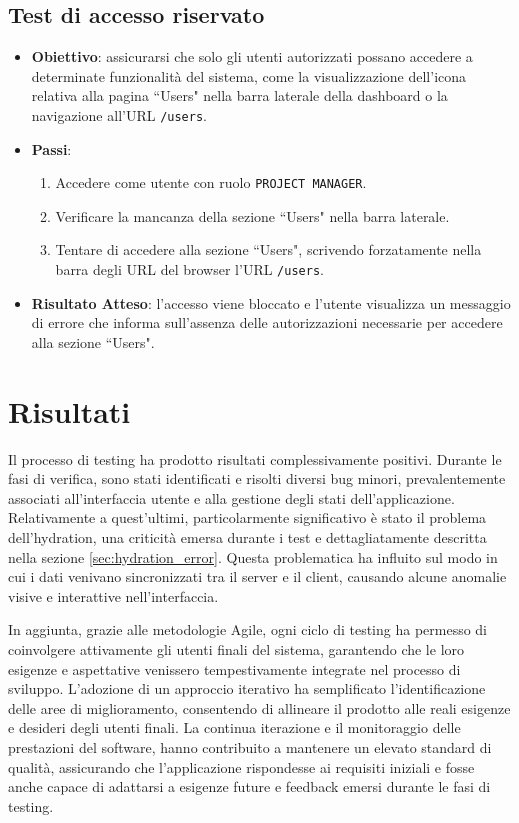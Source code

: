 \documentclass[target=bach,aauheader=,style=]{thud}
\begin{document}
\subsection{Test di accesso riservato}
\begin{itemize}
    \item \textbf{Obiettivo}: assicurarsi che solo gli utenti autorizzati possano accedere a determinate funzionalità del sistema, come la visualizzazione dell'icona relativa alla pagina ``Users" nella barra laterale della dashboard o la navigazione all'URL \texttt{/users}.
    \item \textbf{Passi}:
    \begin{enumerate}
        \item Accedere come utente con ruolo \texttt{PROJECT MANAGER}.
        \item Verificare la mancanza della  sezione ``Users" nella barra laterale.
        \item Tentare di accedere alla sezione ``Users", scrivendo forzatamente nella barra degli URL del browser l'URL \texttt{/users}.
    \end{enumerate}
    \item \textbf{Risultato Atteso}: l'accesso viene bloccato e l'utente visualizza un messaggio di errore che informa sull'assenza delle autorizzazioni necessarie per accedere alla sezione ``Users".
\end{itemize}

\section{Risultati}
Il processo di testing ha prodotto risultati complessivamente positivi. Durante le fasi di verifica, sono stati identificati e risolti diversi bug minori, prevalentemente associati all'interfaccia utente e alla gestione degli stati dell'applicazione. Relativamente a quest'ultimi, particolarmente significativo è stato il problema dell'hydration, una criticità emersa durante i test e dettagliatamente descritta nella sezione \ref{sec:hydration_error}. Questa problematica ha influito sul modo in cui i dati venivano sincronizzati tra il server e il client, causando alcune anomalie visive e interattive nell'interfaccia.

\noindent In aggiunta, grazie alle metodologie Agile, ogni ciclo di testing ha permesso di coinvolgere attivamente gli utenti finali del sistema, garantendo che le loro esigenze e aspettative venissero tempestivamente integrate nel processo di sviluppo. L'adozione di un approccio iterativo ha semplificato l'identificazione delle aree di miglioramento, consentendo di allineare il prodotto alle reali esigenze e desideri degli utenti finali. La continua iterazione e il monitoraggio delle prestazioni del software, hanno contribuito a mantenere un elevato standard di qualità, assicurando che l'applicazione rispondesse ai requisiti iniziali e fosse anche capace di adattarsi a esigenze future e feedback emersi durante le fasi di testing.
\end{document}
